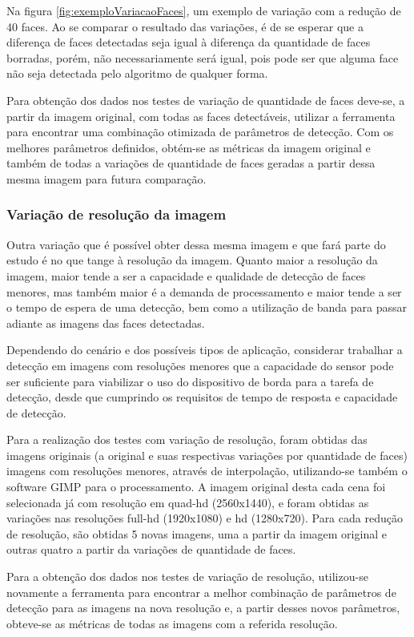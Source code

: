 Na figura \ref{fig:exemploVariacaoFaces}, um exemplo de variação com a redução de 40 faces. Ao se comparar o resultado das variações, é de se esperar que a diferença de faces detectadas seja igual à diferença da quantidade de faces borradas, porém, não necessariamente será igual, pois pode ser que alguma face não seja detectada pelo algoritmo de qualquer forma.

Para obtenção dos dados nos testes de variação de quantidade de faces deve-se, a partir da imagem original, com todas as faces detectáveis, utilizar a ferramenta para encontrar uma combinação otimizada de parâmetros de detecção. Com os melhores parâmetros definidos, obtém-se as métricas da imagem original e também de todas a variações de quantidade de faces geradas a partir dessa mesma imagem para futura comparação.

\subsubsection{Variação de resolução da imagem}

Outra variação que é possível obter dessa mesma imagem e que fará parte do estudo é no que tange à resolução da imagem. Quanto maior a resolução da imagem, maior tende a ser a capacidade e qualidade de detecção de faces menores, mas também maior é a demanda de processamento e maior tende a ser o tempo de espera de uma detecção, bem como a utilização de banda para passar adiante as imagens das faces detectadas.

Dependendo do cenário e dos possíveis tipos de aplicação, considerar trabalhar a detecção em imagens com resoluções menores que a capacidade do sensor pode ser suficiente para viabilizar o uso do dispositivo de borda para a tarefa de detecção, desde que cumprindo os requisitos de tempo de resposta e capacidade de detecção.

Para a realização dos testes com variação de resolução, foram obtidas das imagens originais (a original e suas respectivas variações por quantidade de faces) imagens com resoluções menores, através de interpolação, utilizando-se também o software GIMP para o processamento. A imagem original desta cada cena foi selecionada já com resolução em quad-hd (2560x1440), e foram obtidas as variações nas resoluções full-hd (1920x1080) e hd (1280x720). Para cada redução de resolução, são obtidas 5 novas imagens, uma a partir da imagem original e outras quatro a partir da variações de quantidade de faces.

Para a obtenção dos dados nos testes de variação de resolução, utilizou-se novamente a ferramenta para encontrar a melhor combinação de parâmetros de detecção para as imagens na nova resolução e, a partir desses novos parâmetros, obteve-se as métricas de todas as imagens com a referida resolução.

